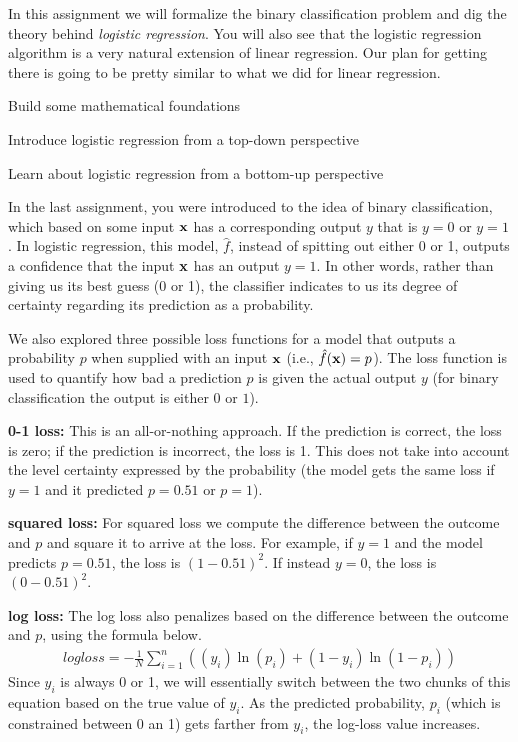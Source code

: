 \documentclass[assignment04_Solutions]{subfiles}
\begin{document}
In this assignment we will formalize the binary classification problem and dig the theory behind \emph{logistic regression}.  You will also see that the logistic regression algorithm is a very natural extension of linear regression.  Our plan for getting there is going to be pretty similar to what we did for linear regression.
\bi
\item Build some mathematical foundations
\item Introduce logistic regression from a top-down perspective
\item Learn about logistic regression from a bottom-up perspective
\ei



\begin{recall}
In the last assignment, you were introduced to the idea of binary classification, which based on some input $\mathbf{x}$ has a corresponding output $y$ that is $y= 0$ or $y= 1$. In logistic regression, this model, $\hat{f}$, instead of spitting out either 0 or 1, outputs a confidence that the input $\mathbf{x}$ has an output $y= 1$.  In other words, rather than giving us its best guess (0 or 1), the classifier indicates to us its degree of certainty regarding its prediction as a probability.

We also explored three possible loss functions for a model that outputs a probability $p$ when supplied with an input $\mathbf{x}$ (i.e., $\hat{f}(\mathbf{x})=p$). The loss function is used to quantify how bad a prediction $p$ is given the actual output $y$ (for binary classification the output is either $0$ or $1$).

\be
\item \textbf{0-1 loss:} This is an all-or-nothing approach. If the prediction is correct, the loss is zero; if the prediction is incorrect, the loss is 1. This does not take into account the level certainty expressed by the probability (the model gets the same loss if $y = 1$ and it predicted $p = 0.51$ or $p = 1$).
\item \textbf{squared loss:}  For squared loss we compute the difference between the outcome and $p$ and square it to arrive at the loss.  For example, if $y = 1$ and the model predicts $p = 0.51$, the loss is $(1 - 0.51)^2$.  If instead $y = 0$, the loss is $(0 - 0.51)^2$.
\item \textbf{log loss:} The log loss also penalizes based on the difference between the outcome and $p$, using the formula below.
\begin{align}
 logloss = -\frac{1}{N}\sum_{i=1}^n ( (y_i) \ln (p_i) + (1-y_i) \ln (1 - p_i) )\label{eq:loglosseq}
\end{align}
Since $y_i$ is always 0 or 1, we will essentially switch between the two chunks of this equation based on the true value of $y_i$. As the predicted probability, $p_i$ (which is constrained between 0 an 1) gets farther from $y_i$, the log-loss value increases.
\ee

\end{recall}
\end{document}
